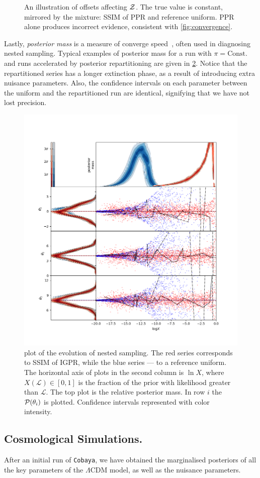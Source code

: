 \documentclass[usenatbib]{mnras}
\begin{document}
\begin{figure}
  
  \caption{An illustration of offsets affecting ${\cal Z}$. The true
    value is constant, mirrored by the mixture: SSIM of PPR and
    reference uniform. PPR alone produces incorrect
    evidence, consistent with \cref{fig:convergence}. \label{fig:drift}}
\end{figure}


Lastly, \emph{posterior mass} is a measure of converge
speed~\cite{higson2018nestcheck}, often used in diagnosing nested
sampling. Typical examples of posterior mass for a run with
$\pi=\text{Const.}$ and runs accelerated by posterior repartitioning
are given in \cref{fig:higson}. Notice that the repartitioned series
has a longer extinction phase, as a result of introducing extra
nuisance parameters. Also, the confidence intervals on each parameter
between the uniform and the repartitioned run are identical,
signifying that we have not lost precision.

\begin{figure}
\includegraphics[width=.5\textwidth]{./illustrations/higson.png}
\caption{plot of the evolution of nested sampling. The \color{red} red
  \color{black} series corresponds to SSIM of IGPR, while the
  \color{blue} blue \color{black} series --- to a reference
  uniform. The horizontal axis of plots in the second column is
  \(\ln X\), where \(X(\mathcal{L}) \in [0,1]\) is the fraction of the
  prior with likelihood greater than \(\mathcal{L}\). The top plot is
  the relative posterior mass. In row $i$ the ${\cal P}(\theta_{i})$
  is plotted. Confidence intervals represented with color
  intensity. \label{fig:higson}}
\end{figure}




\subsection{Cosmological Simulations.}\label{sec:orgb81c159}
After an initial run of \texttt{Cobaya}, we have obtained the marginalised
posteriors of all the key parameters of the \(\Lambda\)CDM model,
as well as the nuisance parameters.
\end{document}
